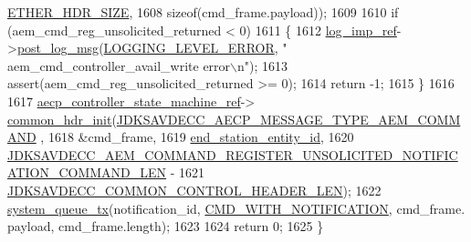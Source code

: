 \begin{DoxyCode}
      \hyperlink{namespaceavdecc__lib_a6c827b1a0d973e18119c5e3da518e65ca9512ad9b34302ba7048d88197e0a2dc0}{ETHER\_HDR\_SIZE},
1608                                                                                                       \textcolor{keyword}{
      sizeof}(cmd\_frame.payload));
1609 
1610     \textcolor{keywordflow}{if} (aem\_cmd\_reg\_unsolicited\_returned < 0)
1611     \{
1612         \hyperlink{namespaceavdecc__lib_acbe3e2a96ae6524943ca532c87a28529}{log\_imp\_ref}->\hyperlink{classavdecc__lib_1_1log_a68139a6297697e4ccebf36ccfd02e44a}{post\_log\_msg}(\hyperlink{namespaceavdecc__lib_a501055c431e6872ef46f252ad13f85cdaf2c4481208273451a6f5c7bb9770ec8a}{LOGGING\_LEVEL\_ERROR}, \textcolor{stringliteral}{"
      aem\_cmd\_controller\_avail\_write error\(\backslash\)n"});
1613         assert(aem\_cmd\_reg\_unsolicited\_returned >= 0);
1614         \textcolor{keywordflow}{return} -1;
1615     \}
1616 
1617     \hyperlink{namespaceavdecc__lib_a0b1b5aea3c0490f77cbfd9178af5be22}{aecp\_controller\_state\_machine\_ref}->
      \hyperlink{classavdecc__lib_1_1aecp__controller__state__machine_aafc737d7ed17a62fed9df6528f18d3ec}{common\_hdr\_init}(\hyperlink{group__aecp__message__type_ga4625ce189cc209f42deb0629f48faf69}{JDKSAVDECC\_AECP\_MESSAGE\_TYPE\_AEM\_COMMAND}
      ,
1618                                                        &cmd\_frame,
1619                                                        \hyperlink{classavdecc__lib_1_1end__station__imp_ac32ac278fb799e1b4f0cd539e0abe2b5}{end\_station\_entity\_id},
1620                                                        
      \hyperlink{group__command__register__unsolicited__notification_ga6438f824be9cf76e1038ed8b5bc14bf9}{JDKSAVDECC\_AEM\_COMMAND\_REGISTER\_UNSOLICITED\_NOTIFICATION\_COMMAND\_LEN}
       -
1621                                                            
      \hyperlink{group__jdksavdecc__avtp__common__control__header_gaae84052886fb1bb42f3bc5f85b741dff}{JDKSAVDECC\_COMMON\_CONTROL\_HEADER\_LEN});
1622     \hyperlink{namespaceavdecc__lib_a6dd511685627c0865a3442b539a4e8e9}{system\_queue\_tx}(notification\_id, \hyperlink{namespaceavdecc__lib_aabcadff06aa62be0ce47bc0646823604aba48b8a017e06fb240b650cdea965178}{CMD\_WITH\_NOTIFICATION}, cmd\_frame.
      payload, cmd\_frame.length);
1623 
1624     \textcolor{keywordflow}{return} 0;
1625 \}
\end{DoxyCode}


